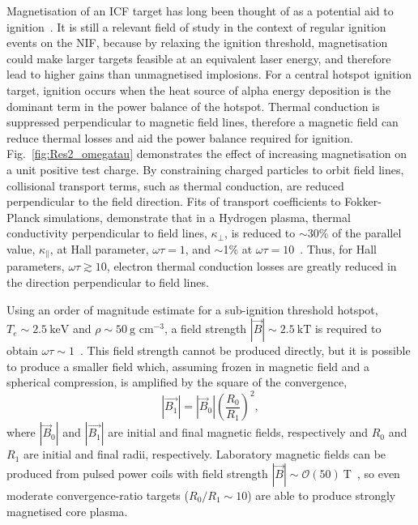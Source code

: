 Magnetisation of an \ac{ICF} target has long been thought of as a potential aid to ignition~\cite{lindemuth_parameter_1983,jones_physics_1986}.
It is still a relevant field of study in the context of regular ignition events on the \ac{NIF}, because by relaxing the ignition threshold, magnetisation could make larger targets feasible at an equivalent laser energy, and therefore lead to higher gains than unmagnetised implosions.
For a central hotspot ignition target, ignition occurs when the heat source of alpha energy deposition is the dominant term in the power balance of the hotspot.
Thermal conduction is suppressed perpendicular to magnetic field lines, therefore a magnetic field can reduce thermal losses and aid the power balance required for ignition.
Fig.~\ref{fig:Res2_omegatau} demonstrates the effect of increasing magnetisation on a unit positive test charge.
By constraining charged particles to orbit field lines, collisional transport terms, such as thermal conduction, are reduced perpendicular to the field direction.
Fits of transport coefficients to Fokker-Planck simulations, demonstrate that in a Hydrogen plasma, thermal conductivity perpendicular to field lines, $\kappa_{\perp}$, is reduced to $\sim$30\% of the parallel value, $\kappa_{\parallel}$, at Hall parameter, $\omega\tau=1$, and $\sim$1\% at $\omega\tau=10$~\cite{epperlein_plasma_1986}.
Thus, for Hall parameters, $\omega\tau\gtrsim 10$, electron thermal conduction losses are greatly reduced in the direction perpendicular to field lines.

Using an order of magnitude estimate for a sub-ignition threshold hotspot, $T_e\sim 2.5\ \text{keV}$ and $\rho\sim50\ \text{g cm}^{-3}$, a field strength $|\vec{B}|\sim 2.5\ \text{kT}$ is required to obtain $\omega\tau\sim1$~\cite{oneill_modelling_2023}.
This field strength cannot be produced directly, but it is possible to produce a smaller field which, assuming frozen in magnetic field and a spherical compression, is amplified by the square of the convergence,
\begin{equation}
    \label{eq:Res2_flux_compression}
    |\vec{B_1}|=|\vec{B}_0| \left(\frac{R_0}{R_1}\right)^2,
\end{equation}
where $|\vec{B}_0|$ and $|\vec{B_1}|$ are initial and final magnetic fields, respectively and $R_0$ and $R_1$ are initial and final radii, respectively.
Laboratory magnetic fields can be produced from pulsed power coils with field strength $|\vec{B}|\sim\mathcal{O}(50)\ \text{T}$~\cite{fiksel_note_2015}, so even moderate convergence-ratio targets ($R_0/R_1\sim10$) are able to produce strongly magnetised core plasma.

